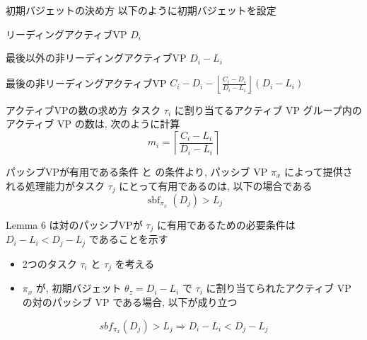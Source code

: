 \begin{frame}{初期バジェットの決め方}
    以下のように初期バジェットを設定
    \begin{block}{リーディングアクティブVP}
        $D_i$
    \end{block}
    \begin{block}{最後以外の非リーディングアクティブVP}
        $D_i - L_i$
    \end{block}
    \begin{block}{最後の非リーディングアクティブVP}
        $C_{i}-D_{i}-\left\lfloor\frac{C_{i}-D_{i}}{D_{i}-L_{i}}\right\rfloor\left(D_{i}-L_{i}\right)$
    \end{block}
\end{frame}

\begin{frame}{アクティブVPの数の求め方}
    タスク $\tau_{i}$ に割り当てるアクティブ VP グループ内のアクティブ VP の数は, 次のように計算
    \begin{equation*}
        m_{i}=\left\lceil\frac{C_{i}-L_{i}}{D_{i}-L_{i}}\right\rceil
    \end{equation*}
\end{frame}

\begin{frame}{パッシブVPが有用である条件}
     と  の条件より, パッシブ VP $\pi_{x}$ によって提供される処理能力がタスク $\tau_{j}$ にとって有用であるのは, 以下の場合である
    \begin{equation*}
        \operatorname{sbf}_{\pi_{x}}\left(D_{j}\right)>L_{j}
    \end{equation*}

\end{frame}

\begin{frame}[label=lemma6]{Lemma 6}
     は対のパッシブVPが $\tau_j$ に有用であるための必要条件は $D_{i}-L_{i}<D_{j}-L_{j}$ であることを示す
    \begin{lemma}[]
        \setlength{\linewidth}{0.98\columnwidth}
        \begin{itemize}
            \item 2つのタスク $\tau_{i}$ と $\tau_{j}$ を考える
            \item $\pi_{x}$ が, 初期バジェット $\theta_{z}=D_{i}-L_{i}$ で $\tau_{i}$ に割り当てられたアクティブ VP の対のパッシブ VP である場合, 以下が成り立つ
        \end{itemize}
        \begin{equation*}
            s b f_{\pi_{x}}\left(D_{j}\right)>L_{j} \Rightarrow D_{i}-L_{i}<D_{j}-L_{j}
        \end{equation*}
    \end{lemma}
\end{frame}

